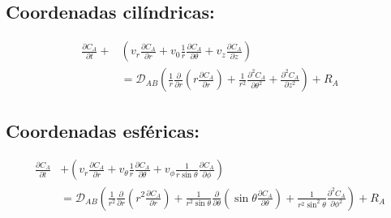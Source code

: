 \subsection*{Coordenadas cilíndricas:}
\begin{equation} 
    \begin{split} 
    \frac{\partial C_A}{\partial t} + &\left( v_r \frac{\partial C_A}{\partial r} + v_0 \frac{1}{r} \frac{\partial C_A}{\partial \theta} + v_z \frac{\partial C_A}{\partial z} \right) \\
      &= \mathscr{D}_{AB} \left( \frac{1}{r} \frac{\partial}{\partial r} \left( r \frac{\partial C_A}{\partial r} \right) + \frac{1}{r^2} \frac{\partial^2 C_A}{\partial \theta^2} + \frac{\partial^2 C_A}{\partial z^2} \right) + R_A
    \end{split} 
    \label{eq_B}
    \tag{B}
\end{equation}

\subsection*{Coordenadas esféricas:}
\begin{equation}
    \begin{split}
        \frac{\partial C_A}{\partial t} &+ \left( v_r \frac{\partial C_A}{\partial r} + v_{\theta} \frac{1}{r} \frac{\partial C_A}{\partial \theta} + v_\phi \frac{1}{r \sin \theta} \frac{\partial C_A}{\partial \phi} \right) \\
        &= \mathscr{D}_{AB} \left( \frac{1}{r^2} \frac{\partial}{\partial r} \left( r^2 \frac{\partial C_A}{\partial r} \right) + \frac{1}{r^2 \sin \theta} \frac{\partial}{\partial \theta} \left( \sin \theta \frac{\partial C_A}{\partial \theta} \right) + \frac{1}{r^2 \sin^2 \theta} \frac{\partial^2 C_A}{\partial \phi^2} \right) + R_A 
    \end{split}
    \tag{C}
\end{equation}

\newpage



